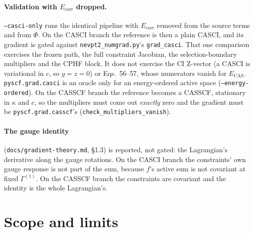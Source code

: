 \documentclass[11pt]{article}
\newcommand{\code}[1]{\texttt{#1}}
\newcommand{\G}[1]{\Gamma^{(#1)}}
\newcommand{\Ecas}{E_{\mathrm{CAS}}}
\newcommand{\Ecorr}{E_{\mathrm{corr}}}
\begin{document}
\paragraph{Validation with $\Ecorr$ dropped.} \code{--casci-only} runs the
identical pipeline with $\Ecorr$ removed from the source terms and from $\Phi$.
On the CASCI branch the reference is then a plain CASCI, and its gradient is
gated against \code{nevpt2\_numgrad.py}'s \code{grad\_casci}. That one
comparison exercises the frozen path, the full constraint Jacobian, the
selection-boundary multipliers and the CPHF block. It does not exercise the
CI Z-vector (a CASCI is variational in $c$, so $y = z = 0$) or Eqs.~56--57,
whose numerators vanish for $\Ecas$. \code{pyscf.grad.casci} is an oracle only
for an energy-ordered active space (\code{--energy-ordered}). On the CASSCF
branch the reference becomes a CASSCF, stationary in $\kappa$ and $c$, so the
multipliers must come out \emph{exactly} zero and the gradient must be
\code{pyscf.grad.casscf}'s (\code{check\_multipliers\_vanish}).

\paragraph{The gauge identity} (\code{docs/gradient-theory.md}, \S1.3) is
reported, not gated: the Lagrangian's derivative along the gauge rotations.
On the CASCI branch the constraints' own gauge response is not part of the
sum, because $f$'s active sum is not covariant at fixed $\G1$. On the CASSCF
branch the constraints are covariant and the identity is the whole
Lagrangian's.

\section{Scope and limits}
\label{sec:limits}
\end{document}

